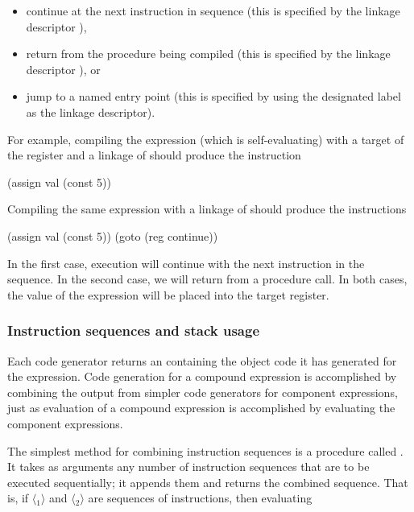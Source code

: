 \begin{itemize}
\item
continue at the next instruction in sequence (this is specified by the linkage
descriptor ),

\item
return from the procedure being compiled (this is specified by the linkage
descriptor ), or

\item
jump to a named entry point (this is specified by using the designated label as
the linkage descriptor).
\end{itemize}

\noindent
For example, compiling the expression  (which is self-evaluating) with
a target of the  register and a linkage of  should produce
the instruction

\begin{codeBlock}
(assign val (const 5))
\end{codeBlock}

\noindent
Compiling the same expression with a linkage of  should produce
the instructions

\begin{codeBlock}
(assign val (const 5))
(goto (reg continue))
\end{codeBlock}

\noindent
In the first case, execution will continue with the next instruction in the
sequence. In the second case, we will return from a procedure call.  In both
cases, the value of the expression will be placed into the target 
register.

\subsubsection*{Instruction sequences and stack usage}

Each code generator returns an  containing the
object code it has generated for the expression.  Code generation for a
compound expression is accomplished by combining the output from simpler code
generators for component expressions, just as evaluation of a compound
expression is accomplished by evaluating the component expressions.

The simplest method for combining instruction sequences is a procedure called
.  It takes as arguments any number of
instruction sequences that are to be executed sequentially; it appends them and
returns the combined sequence.  That is, if \( \langle \)\( _1\rangle \) and \( \langle \)\( _2\rangle \) are
sequences of instructions, then evaluating

